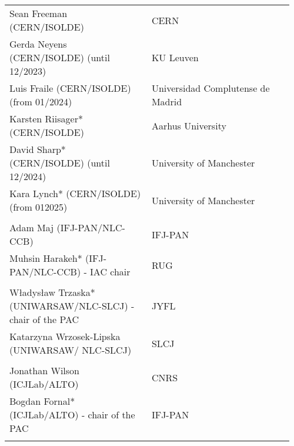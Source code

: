 \begin{longtable}{|L{0.48\linewidth}|C{0.48\linewidth}|}
      \\ \hline
    Sean Freeman (CERN/ISOLDE)	& CERN \\ \hline
    Gerda Neyens (CERN/ISOLDE) (until 12/2023)	& KU Leuven \\ \hline
    Luis Fraile (CERN/ISOLDE) (from 01/2024)	& Universidad Complutense de Madrid \\ \hline
    Karsten Riisager* (CERN/ISOLDE)	& Aarhus University \\ \hline
    David Sharp* (CERN/ISOLDE) (until 12/2024)	& University of Manchester \\ \hline
    Kara Lynch* (CERN/ISOLDE) (from 012025)	& University of Manchester \\ \hline
    
      \\ \hline
    Adam Maj (IFJ-PAN/NLC-CCB)	& IFJ-PAN \\ \hline
    Muhsin Harakeh*  (IFJ-PAN/NLC-CCB) - IAC chair	& RUG \\ \hline

      \\ \hline
    Władysław Trzaska* (UNIWARSAW/NLC-SLCJ) - chair of the PAC	& JYFL \\ \hline
    Katarzyna Wrzosek-Lipska (UNIWARSAW/ NLC-SLCJ)	& SLCJ \\ \hline

        \pagebreak
      \\ \hline
    Jonathan Wilson (ICJLab/ALTO)	& CNRS \\ \hline
    Bogdan Fornal* (ICJLab/ALTO) - chair of the PAC	& IFJ-PAN \\ \hline

      \\ \hline
   

\end{longtable}
